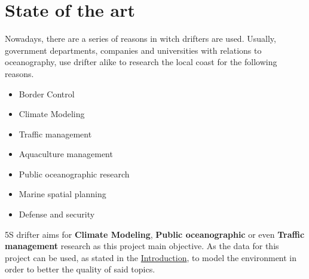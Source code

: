 \section{State of the art}
Nowadays, there are a series of reasons in witch drifters are used. Usually, government 
departments, companies and universities with relations to oceanography, use drifter alike 
to research the local coast for the following reasons.

\begin{itemize}
    \item Border Control
    \item Climate Modeling
    \item Traffic management
    \item Aquaculture management
    \item Public oceanographic research
    \item Marine spatial planning
    \item Defense and security
\end{itemize}

5S drifter aims for \textbf{Climate Modeling}, \textbf{Public oceanographic} or even \textbf{Traffic management} research as this project main objective.
As the data for this project can be used, as stated in the \hyperref[sec:Problem Statement]{Introduction}, to model the environment
in order to better the quality of said topics.


